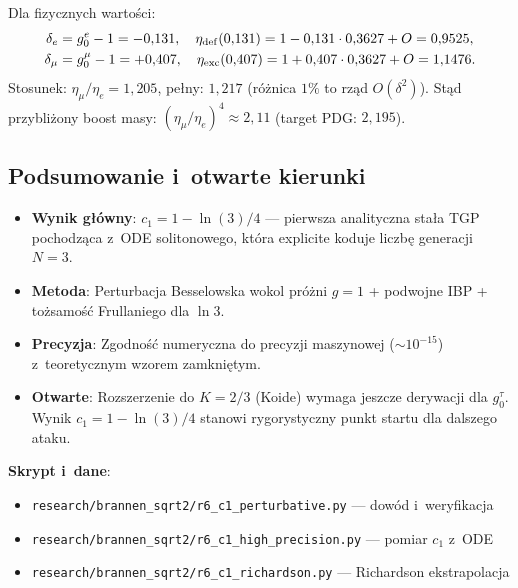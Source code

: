Dla fizycznych warto\'sci:
\begin{align*}
  \delta_e &= g_0^e - 1 = -0{,}131, \quad \eta_{\rm def}(0{,}131) = 1 - 0{,}131 \cdot 0{,}3627 + O = 0{,}9525, \\
  \delta_\mu &= g_0^\mu - 1 = +0{,}407, \quad \eta_{\rm exc}(0{,}407) = 1 + 0{,}407 \cdot 0{,}3627 + O = 1{,}1476.
\end{align*}
Stosunek: $\eta_\mu/\eta_e = 1{,}205$, pe\l{}ny: $1{,}217$ (r\'o\.znica $1\%$ to
rz\k{a}d $O(\delta^2)$). St\k{a}d przybli\.zony boost masy:
$(\eta_\mu/\eta_e)^4 \approx 2{,}11$ (target PDG: $2{,}195$).

\subsection{Podsumowanie i~otwarte kierunki}
\label{app:T5-summary}

\begin{itemize}
  \item \textbf{Wynik g\l{}\'owny}: $c_1 = 1 - \ln(3)/4$ --- pierwsza analityczna
        sta\l{}a TGP pochodz\k{a}ca z~ODE solitonowego, kt\'ora explicite
        koduje liczb\k{e} generacji $N = 3$.
  \item \textbf{Metoda}: Perturbacja Besselowska wokol pr\'o\.zni $g = 1$
        + podwojne IBP + to\.zsamo\'s\'c Frullaniego dla $\ln 3$.
  \item \textbf{Precyzja}: Zgodno\'s\'c numeryczna do precyzji maszynowej
        ($\sim 10^{-15}$) z~teoretycznym wzorem zamkni\k{e}tym.
  \item \textbf{Otwarte}: Rozszerzenie do $K = 2/3$ (Koide) wymaga
        jeszcze derywacji dla $g_0^\tau$. Wynik $c_1 = 1 - \ln(3)/4$
        stanowi rygorystyczny punkt startu dla dalszego ataku.
\end{itemize}

\medskip
\textbf{Skrypt i~dane}:
\begin{itemize}
\item \texttt{research/brannen\_sqrt2/r6\_c1\_perturbative.py} --- dow\'od i~weryfikacja
\item \texttt{research/brannen\_sqrt2/r6\_c1\_high\_precision.py} --- pomiar $c_1$ z~ODE
\item \texttt{research/brannen\_sqrt2/r6\_c1\_richardson.py} --- Richardson ekstrapolacja
\end{itemize}
